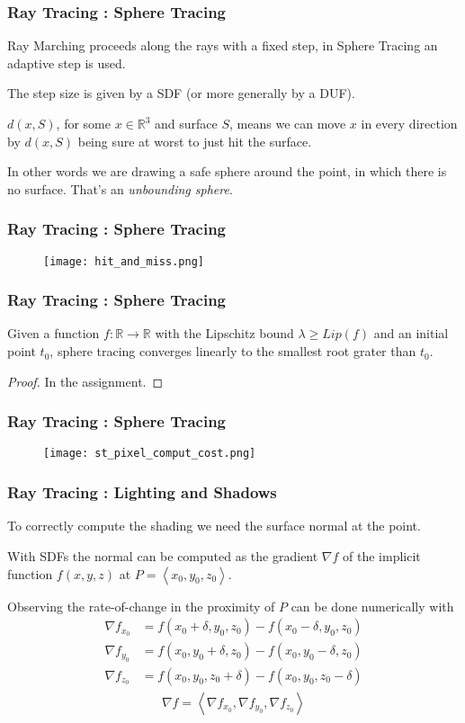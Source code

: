 \documentclass{beamer}
\newcommand\R{\ensuremath{\mathbb{R}}}
\begin{document}
\begin{frame}
\frametitle{Ray Tracing : Sphere Tracing}
Ray Marching proceeds along the rays with a fixed step, in Sphere Tracing an adaptive step is used.

The step size is given by a SDF (or more generally by a DUF).

$d(x,S)$, for some $x \in \R^3$ and surface $S$, means we can move $x$ in every direction by $d(x,S)$ being sure at worst to just hit the surface.

In other words we are drawing a safe sphere around the point, in which there is no surface.
That's an \emph{unbounding sphere}.
\frametitle{Ray Tracing : Sphere Tracing}
\begin{figure}[!htb]
  \centering
  \texttt{[image: hit\_and\_miss.png]}
\end{figure}
\end{frame}


\begin{frame}
\frametitle{Ray Tracing : Sphere Tracing}
\begin{theorem}
Given a function $f: \R \to \R$ with the Lipschitz bound $\lambda \geq Lip(f)$ and an initial point $t_0$, sphere tracing converges linearly to the smallest root grater than $t_0$.
\end{theorem}
\begin{proof}
  In the assignment.
\end{proof}

\end{frame}

\begin{frame}
\frametitle{Ray Tracing : Sphere Tracing}
\begin{figure}[!htb]
  \centering
  \texttt{[image: st\_pixel\_comput\_cost.png]}
\end{figure}
\end{frame}


\begin{frame}
\frametitle{Ray Tracing : Lighting and Shadows}
To correctly compute the shading we need the surface normal at the point.

With SDFs the normal can be computed as the gradient $\nabla f$ of the implicit function $f(x,y,z)$
at $P = \left< x_0, y_0, z_0 \right>$.

Observing the rate-of-change in the proximity of $P$ can be done numerically with 
\begin{align*}
  \nabla f_{x_0} &= f(x_0+\delta, y_0       , z_0       ) - f(x_0-\delta, y_0       , z_0)\\
  \nabla f_{y_0} &= f(x_0       , y_0+\delta, z_0       ) - f(x_0       , y_0-\delta, z_0)\\
  \nabla f_{z_0} &= f(x_0       , y_0       , z_0+\delta) - f(x_0       , y_0       , z_0-\delta)
\end{align*}
\begin{align*}
  \nabla f = \left< \nabla f_{x_0}, \nabla f_{y_0}, \nabla f_{z_0} \right>
\end{align*}
\end{frame}
\end{document}
